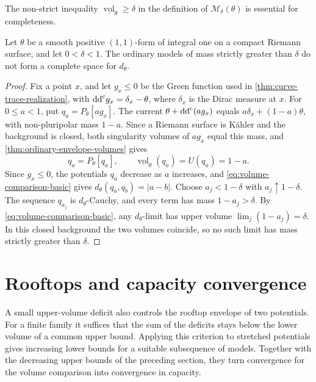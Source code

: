 The non-strict inequality $\underline{\operatorname{vol}}_\theta\geq\delta$ in the definition of $\mathcal M_\delta(\theta)$ is essential for completeness.

\begin{example}\label{ex:strict-volume-cutoff-incomplete}
Let $\theta$ be a smooth positive $(1,1)$-form of integral one on a compact Riemann surface, and let $0<\delta<1$. The ordinary models of mass strictly greater than $\delta$ do not form a complete space for $d_\theta$.
\end{example}
\begin{proof}
Fix a point $x$, and let $g_x\leq0$ be the Green function used in \cref{thm:curve-trace-realization}, with $\mathrm{dd}^{\mathrm{c}} g_x=\delta_x-\theta$, where $\delta_x$ is the Dirac measure at $x$. For $0\leq a<1$, put $q_a=P_\theta[ag_x]$. The current $\theta+\mathrm{dd}^{\mathrm{c}}(ag_x)$ equals $a\delta_x+(1-a)\theta$, with non-pluripolar mass $1-a$. Since a Riemann surface is K\"ahler and the background is closed, both singularity volumes of $ag_x$ equal this mass, and \cref{thm:ordinary-envelope-volumes} gives
\[
 q_a=P_\theta[q_a],\qquad
 \underline{\operatorname{vol}}_\theta(q_a)=U(q_a)=1-a.
\]
Since $g_x\leq0$, the potentials $q_a$ decrease as $a$ increases, and \eqref{eq:volume-comparison-basic} gives $d_\theta(q_a,q_b)=|a-b|$. Choose $a_j<1-\delta$ with $a_j\uparrow1-\delta$. The sequence $q_{a_j}$ is $d_\theta$-Cauchy, and every term has mass $1-a_j>\delta$. By \eqref{eq:volume-comparison-basic}, any $d_\theta$-limit has upper volume $\lim_j(1-a_j)=\delta$. In this closed background the two volumes coincide, so no such limit has mass strictly greater than $\delta$.
\end{proof}

\section{Rooftops and capacity convergence}
\label{sec:volume-rooftop-capacity}

A small upper-volume deficit also controls the rooftop envelope of two potentials. For a finite family it suffices that the sum of the deficits stays below the lower volume of a common upper bound. Applying this criterion to stretched potentials gives increasing lower bounds for a suitable subsequence of models. Together with the decreasing upper bounds of the preceding section, they turn convergence for the volume comparison into convergence in capacity.

